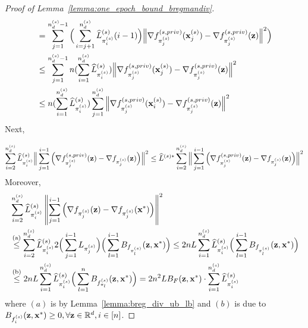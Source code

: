 \begin{proof}[Proof of Lemma~\ref{lemma:one_epoch_bound_bregmandiv}]
\begin{align}
        &= \sum_{j=1}^{n_d^{(s)}-1} \Big( \sum_{i=j+1}^{n_d^{(s)}} \widehat{L}_{\pi_i^{(s)}}^{(s)} (i-1) \Big)\Big\| \nabla f_{\pi_j^{(s)}}^{(s, priv)}({\mathbf{x}}_j^{(s)}) - \nabla f_{\pi_j^{(s)}}^{(s, priv)}({\mathbf{z}})\Big\|^2
        \Big) \\
        &\leq \sum_{j=1}^{n_d^{(s)}-1} n (\sum_{i=1}^{n_d^{(s)}}\widehat{L}_{\pi_i^{(s)}}^{(s)})
        \Big\| \nabla f_{\pi_j^{(s)}}^{(s, priv)}({\mathbf{x}}_j^{(s)}) - \nabla f_{\pi_j^{(s)}}^{(s, priv)}({\mathbf{z}})\Big\|^2 \\
        & \label{eq:breg_diff_term_1}
        \leq n (\sum_{i=1}^{n_d^{(s)}} \widehat{L}_{\pi_i^{(s)}}^{(s)}) \sum_{j=1}^{n_d^{(s)}}
        \Big\| \nabla f_{\pi_j^{(s)}}^{(s, priv)}({\mathbf{x}}_i^{(s)}) - \nabla f_{\pi_j^{(s)}}^{(s, priv)}({\mathbf{z}})\Big\|^2
    \end{align}
    Next,  

    \begin{align}
    \label{eq:breg_diff_term_dissim}
        \sum_{i=2}^{n_d^{(s)}} \widehat{L}_{\pi_i^{(s)}}^{(s)} \Big\| \sum_{j=1}^{i-1} \Big( \nabla f_{\pi_j^{(s)}}^{(s, priv)}({\mathbf{z}}) - \nabla f_{\pi_j^{(s)}}({\mathbf{z}})\Big) \Big\|^2
        \leq \widehat{L}^{(s)*} \sum_{i=2}^{n_d^{(s)}}
        \Big\| \sum_{j=1}^{i-1} \Big( \nabla f_{\pi_j^{(s)}}^{(s, priv)}({\mathbf{z}}) - \nabla f_{\pi_j^{(s)}}({\mathbf{z}})\Big) \Big\|^2
    \end{align}
    Moreover,
    \begin{align}
        &\sum_{i=2}^{n_d^{(s)}} \widehat{L}_{\pi_i^{(s)}}^{(s)}
        \left\| \sum_{j=1}^{i-1} \Big( \nabla f_{\pi_{j}^{(s)}}({\mathbf{z}}) - \nabla f_{\pi_j^{(s)}}({\mathbf{x}}^*) \Big) \right\|^2\\
        \nonumber
        &\stackrel{\text{(a)}}{\leq} \sum_{i=2}^{n_d^{(s)}}\widehat{L}_{\pi_i^{(s)}}^{(s)} 2 \Big(\sum_{j=1}^{i-1} L_{\pi_j^{(s)}} \Big) \Big( \sum_{l=1}^{i-1} B_{f_{\pi_l^{(s)}}}({\mathbf{z}}, {\mathbf{x}}^*)
        \Big)
        \leq 2 n L \sum_{i=1}^{n_d^{(s)}} \widehat{L}_{\pi_i^{(s)}}^{(s)} \Big(\sum_{l=1}^{i-1} B_{f_{\pi_l^{(s)}}}({\mathbf{z}}, {\mathbf{x}}^*) \Big)\\
        &\stackrel{\text{(b)}}{\leq} 2 n L \sum_{i=1}^{n_d^{(s)}} \widehat{L}_{\pi_i^{(s)}}^{(s)} \Big(\sum_{l=1}^{n} B_{f_{\pi_l}^{(s)}}({\mathbf{z}}, {\mathbf{x}}^*) \Big)
    \label{eq:breg_diff_term_2}
        = 2 n^2 L B_F({\mathbf{z}}, {\mathbf{x}}^*) \cdot \sum_{i=1}^{n_d^{(s)}} \widehat{L}_{\pi_i^{(s)}}^{(s)}
    \end{align}
    where $(a)$ is by Lemma~\ref{lemma:breg_div_ub_lb} and $(b)$ is due to $B_{f_i^{(s)}}({\mathbf{z}}, {\mathbf{x}}^*) \geq 0, \forall {\mathbf{z}}\in\mathbb{R}^{d}, i\in [n]$.



\end{proof}
